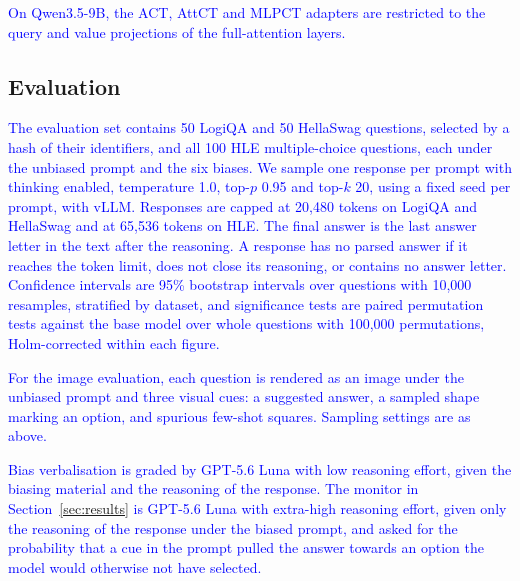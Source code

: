 \textcolor{blue}{On Qwen3.5-9B, the ACT, AttCT and MLPCT adapters are restricted to the query and value projections of the full-attention layers.}

\subsection{Evaluation}
\textcolor{blue}{The evaluation set contains 50 LogiQA and 50 HellaSwag questions, selected by a hash of their identifiers, and all 100 HLE multiple-choice questions, each under the unbiased prompt and the six biases.} \textcolor{blue}{We sample one response per prompt with thinking enabled, temperature 1.0, top-$p$ 0.95 and top-$k$ 20, using a fixed seed per prompt, with vLLM.} \textcolor{blue}{Responses are capped at 20,480 tokens on LogiQA and HellaSwag and at 65,536 tokens on HLE.} \textcolor{blue}{The final answer is the last answer letter in the text after the reasoning.} \textcolor{blue}{A response has no parsed answer if it reaches the token limit, does not close its reasoning, or contains no answer letter.} \textcolor{blue}{Confidence intervals are 95\% bootstrap intervals over questions with 10,000 resamples, stratified by dataset, and significance tests are paired permutation tests against the base model over whole questions with 100,000 permutations, Holm-corrected within each figure.}

\textcolor{blue}{For the image evaluation, each question is rendered as an image under the unbiased prompt and three visual cues: a suggested answer, a sampled shape marking an option, and spurious few-shot squares.} \textcolor{blue}{Sampling settings are as above.}

\textcolor{blue}{Bias verbalisation is graded by GPT-5.6 Luna with low reasoning effort, given the biasing material and the reasoning of the response.} \textcolor{blue}{The monitor in Section~\ref{sec:results} is GPT-5.6 Luna with extra-high reasoning effort, given only the reasoning of the response under the biased prompt, and asked for the probability that a cue in the prompt pulled the answer towards an option the model would otherwise not have selected.}

